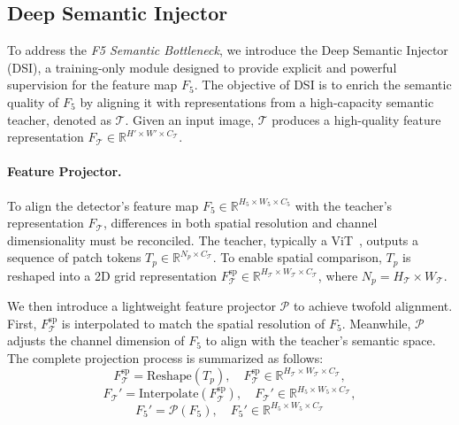 \subsection{Deep Semantic Injector}
\label{subsec:dsi}
To address the \textit{F5 Semantic Bottleneck}, we introduce the Deep Semantic Injector (DSI), a training-only module designed to provide explicit and powerful supervision for the feature map $F_5$. The objective of DSI is to enrich the semantic quality of $F_5$ by aligning it with representations from a high-capacity semantic teacher, denoted as $\mathcal{T}$. Given an input image, $\mathcal{T}$ produces a high-quality feature representation $F_{\mathcal{T}} \in \mathbb{R}^{H' \times W' \times C_{\mathcal{T}}}$.

\paragraph{Feature Projector.}
To align the detector's feature map $F_5 \in \mathbb{R}^{H_5 \times W_5 \times C_5}$ with the teacher's representation $F_{\mathcal{T}}$, differences in both spatial resolution and channel dimensionality must be reconciled.
The teacher, typically a ViT~\cite{dosovitskiy2020image}, outputs a sequence of patch tokens $T_p \in \mathbb{R}^{N_p \times C_{\mathcal{T}}}$. To enable spatial comparison, $T_p$ is reshaped into a 2D grid representation $F_{\mathcal{T}}^{\text{sp}} \in \mathbb{R}^{H_{\mathcal{T}} \times W_{\mathcal{T}} \times C_{\mathcal{T}}}$, where $N_p = H_{\mathcal{T}} \times W_{\mathcal{T}}$.

We then introduce a lightweight feature projector $\mathcal{P}$ to achieve twofold alignment. First, $F_{\mathcal{T}}^{\text{sp}}$ is interpolated to match the spatial resolution of $F_5$. Meanwhile, $\mathcal{P}$ adjusts the channel dimension of $F_5$ to align with the teacher's semantic space. 
The complete projection process is summarized as follows:
\begin{equation}
F_{\mathcal{T}}^{\text{sp}} = \text{Reshape}(T_p), \quad F_{\mathcal{T}}^{\text{sp}} \in \mathbb{R}^{H_{\mathcal{T}} \times W_{\mathcal{T}} \times C_{\mathcal{T}}},
\label{eq:reshape}
\end{equation}
\begin{equation}
F_{\mathcal{T}}' = \text{Interpolate}(F_{\mathcal{T}}^{\text{sp}}), \quad F_{\mathcal{T}}' \in \mathbb{R}^{H_5 \times W_5 \times C_{\mathcal{T}}},
\label{eq:interpolate}
\end{equation}
\begin{equation}
F_5' = \mathcal{P}(F_5), \quad F_5' \in \mathbb{R}^{H_5 \times W_5 \times C_{\mathcal{T}}}
\label{eq:project}
\end{equation}

